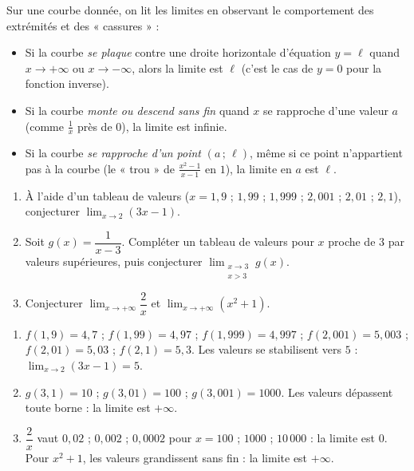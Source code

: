 \documentclass[11pt]{article}
\begin{document}
Sur une courbe donnée, on lit les limites en observant le comportement des extrémités et des « cassures » :
\begin{itemize}
\item Si la courbe \emph{se plaque} contre une droite horizontale d'équation $y = \ell$ quand $x \to +\infty$ ou $x \to -\infty$, alors la limite est $\ell$ (c'est le cas de $y = 0$ pour la fonction inverse).
\item Si la courbe \emph{monte ou descend sans fin} quand $x$ se rapproche d'une valeur $a$ (comme $\frac{1}{x}$ près de $0$), la limite est infinie.
\item Si la courbe \emph{se rapproche d'un point} $(a\,;\,\ell)$, même si ce point n'appartient pas à la courbe (le « trou » de $\frac{x^2-1}{x-1}$ en $1$), la limite en $a$ est $\ell$.
\end{itemize}

\begin{exercice}
\begin{enumerate}
\item À l'aide d'un tableau de valeurs ($x = 1{,}9$ ; $1{,}99$ ; $1{,}999$ ; $2{,}001$ ; $2{,}01$ ; $2{,}1$), conjecturer $\displaystyle\lim_{x \to 2} (3x - 1)$.
\item Soit $g(x) = \dfrac{1}{x - 3}$. Compléter un tableau de valeurs pour $x$ proche de $3$ par valeurs supérieures, puis conjecturer $\displaystyle\lim_{\substack{x \to 3 \\ x > 3}} g(x)$.
\item Conjecturer $\displaystyle\lim_{x \to +\infty} \dfrac{2}{x}$ et $\displaystyle\lim_{x \to +\infty} (x^2 + 1)$.
\end{enumerate}
\end{exercice}

\begin{corrige}
\begin{enumerate}
\item $f(1{,}9) = 4{,}7$ ; $f(1{,}99) = 4{,}97$ ; $f(1{,}999) = 4{,}997$ ; $f(2{,}001) = 5{,}003$ ; $f(2{,}01) = 5{,}03$ ; $f(2{,}1) = 5{,}3$. Les valeurs se stabilisent vers $5$ : $\displaystyle\lim_{x \to 2}(3x-1) = 5$.
\item $g(3{,}1) = 10$ ; $g(3{,}01) = 100$ ; $g(3{,}001) = 1000$. Les valeurs dépassent toute borne : la limite est $+\infty$.
\item $\dfrac{2}{x}$ vaut $0{,}02$ ; $0{,}002$ ; $0{,}0002$ pour $x = 100$ ; $1000$ ; $10\,000$ : la limite est $0$. Pour $x^2 + 1$, les valeurs grandissent sans fin : la limite est $+\infty$.
\end{enumerate}
\end{corrige}
\end{document}
